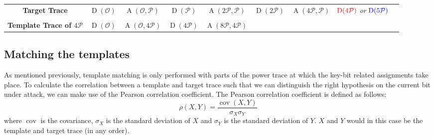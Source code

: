 \begin{table}
{\begin{adjustbox}{max width=.98\textwidth}
\begin{tabular}{*9c}
				\midrule
				\textbf{Target Trace} & $\operatorname{D}(\mathcal{O})$ & $\operatorname{A}(\mathcal{O}, \mathcal{P})$ & $\operatorname{D}(\mathcal{P})$ & $\operatorname{A}(2\mathcal{P}, \mathcal{P})$ &
				$\operatorname{D}(2\mathcal{P})$ & $\operatorname{A}(4\mathcal{P}, \mathcal{P})$ & $\textcolor{red}{\operatorname{D}(4\mathcal{P})}$ \emph{or} $\textcolor{blue}{\operatorname{D}(5\mathcal{P})} $ & \\
				\multicolumn{9}{c}{} \\
				\textbf{Template Trace of $4 \mathcal{P}$}  & $\operatorname{D}(\mathcal{O})$ & $\operatorname{A}(\mathcal{O}, 4\mathcal{P})$ & \cellcolor{red!20} $\operatorname{D}(4\mathcal{P})$ & $\operatorname{A}(8\mathcal{P}, 4\mathcal{P})$ &  & & & \\
				\bottomrule
			\end{tabular}
		\end{adjustbox}
		\label{table: OTA template matching iteration 3}
	}
	\label{table: OTA example visualization}
\end{table}
%

\subsection{Matching the templates}
As mentioned previously, template matching is only performed with parts of the power trace at which the key-bit related assignments take place.
To calculate the correlation between a template and target trace such that we can distinguish the right hypothesis on the current bit under attack, we can make use of the Pearson correlation coefficient. 
The Pearson correlation coefficient is defined as follows:
%
\begin{equation*}
\rho(X, Y) = \frac{\operatorname{cov}(X, Y)}{\sigma_X \sigma_Y}
\end{equation*}
%
where $\operatorname{cov}$ is the covariance, $\sigma_X$ is the standard deviation of $X$ and $\sigma_Y$ is the standard deviation of $Y$.
$X$ and $Y$ would in this case be the template and target trace (in any order).